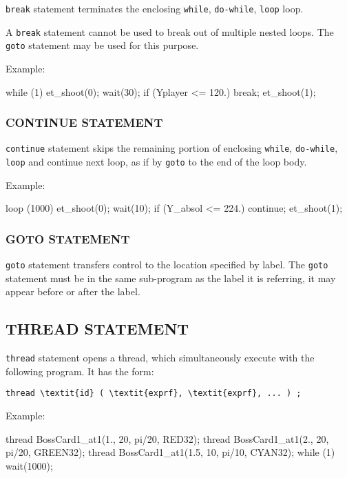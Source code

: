 \documentclass{article}
\begin{document}
\verb|break| statement terminates the enclosing \verb|while|, \verb|do-while|, \verb|loop| loop.

A \verb|break| statement cannot be used to break out of multiple nested loops. The \verb|goto| statement may be used for this purpose.

Example:

\begin{MUAvbt}
while (1) {
	et_shoot(0);
	wait(30);
	if (Yplayer <= 120.)
		break;
}
et_shoot(1);
\end{MUAvbt}

\subsubsection{CONTINUE STATEMENT}

\verb|continue| statement skips the remaining portion of enclosing \verb|while|, \verb|do-while|, \verb|loop| and continue next loop, as if by \verb|goto| to the end of the loop body.

Example:

\begin{MUAvbt}
loop (1000) {
	et_shoot(0);
	wait(10);
	if (Y_absol <= 224.)
		continue;
	et_shoot(1);
}
\end{MUAvbt}

\subsubsection{GOTO STATEMENT}

\verb|goto| statement transfers control to the location specified by label. The \verb|goto| statement must be in the same sub-program as the label it is referring, it may appear before or after the label.

\subsection{THREAD STATEMENT}

\verb|thread| statement opens a thread, which simultaneously execute with the following program. It has the form:

\begin{Verbatim}[frame=single, rulecolor=\color{magenta}, commandchars=\\\{\}]
thread \textit{id} ( \textit{exprf}, \textit{exprf}, ... ) ;
\end{Verbatim}

Example:

\begin{MUAvbt}
thread BossCard1_at1(1., 20, pi/20, RED32);
thread BossCard1_at1(2., 20, pi/20, GREEN32);
thread BossCard1_at1(1.5, 10, pi/10, CYAN32);
while (1) wait(1000);
\end{MUAvbt}
\end{document}
